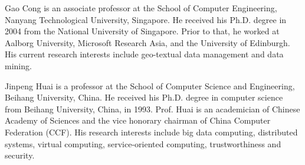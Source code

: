 \documentclass[10pt,journal,compsoc,twoside]{IEEEtran}
\newcounter{prop}
\begin{document}
\vspace{-6ex}
\begin{IEEEbiography}{Gao Cong} is an associate professor at the School of Computer Engineering, Nanyang Technological University, Singapore. He received his Ph.D. degree in 2004 from the National University of Singapore. Prior to that, he worked at Aalborg University, Microsoft Research Asia, and the University of Edinburgh. His current research interests include geo-textual data management and data mining.
\end{IEEEbiography}
\vspace{-6ex}
\begin{IEEEbiography}{Jinpeng Huai} is a professor at the School of Computer Science and Engineering, Beihang University, China. He received his Ph.D. degree in computer science from Beihang University, China, in 1993. Prof. Huai is an academician of Chinese Academy of Sciences and the vice honorary chairman of China Computer Federation (CCF). His research interests include big data computing, distributed systems, virtual computing, service-oriented computing, trustworthiness and security.
\end{IEEEbiography}
\vfill

%

%






\end{document}
